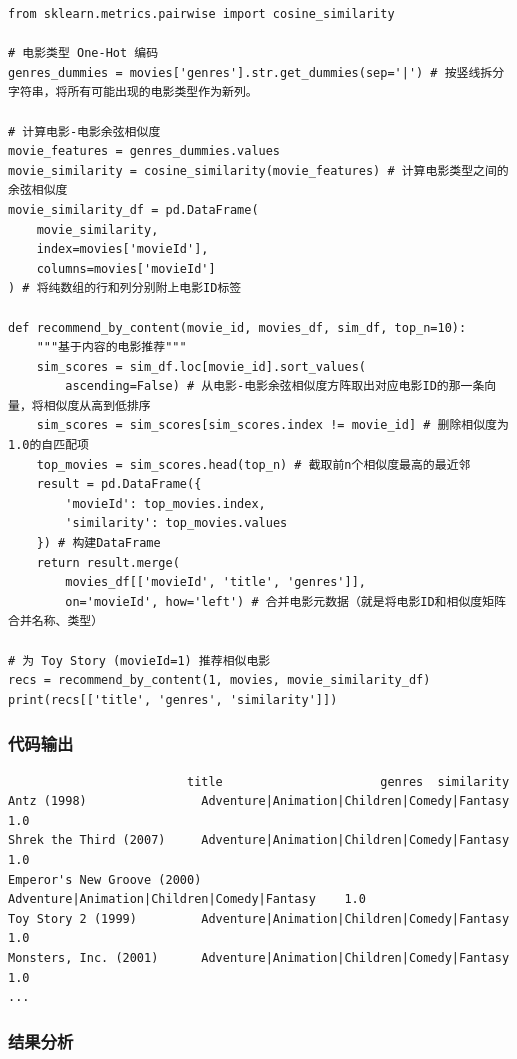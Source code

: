 \documentclass[12pt,a4paper]{ctexart}
\begin{document}
\begin{lstlisting}[caption={基于类型标签的内容推荐}, label={lst:3-1}]
from sklearn.metrics.pairwise import cosine_similarity

# 电影类型 One-Hot 编码
genres_dummies = movies['genres'].str.get_dummies(sep='|') # 按竖线拆分字符串，将所有可能出现的电影类型作为新列。

# 计算电影-电影余弦相似度
movie_features = genres_dummies.values
movie_similarity = cosine_similarity(movie_features) # 计算电影类型之间的余弦相似度
movie_similarity_df = pd.DataFrame(
    movie_similarity,
    index=movies['movieId'],
    columns=movies['movieId']
) # 将纯数组的行和列分别附上电影ID标签

def recommend_by_content(movie_id, movies_df, sim_df, top_n=10):
    """基于内容的电影推荐"""
    sim_scores = sim_df.loc[movie_id].sort_values(
        ascending=False) # 从电影-电影余弦相似度方阵取出对应电影ID的那一条向量，将相似度从高到低排序
    sim_scores = sim_scores[sim_scores.index != movie_id] # 删除相似度为1.0的自匹配项
    top_movies = sim_scores.head(top_n) # 截取前n个相似度最高的最近邻
    result = pd.DataFrame({
        'movieId': top_movies.index,
        'similarity': top_movies.values
    }) # 构建DataFrame
    return result.merge(
        movies_df[['movieId', 'title', 'genres']],
        on='movieId', how='left') # 合并电影元数据（就是将电影ID和相似度矩阵合并名称、类型）

# 为 Toy Story (movieId=1) 推荐相似电影
recs = recommend_by_content(1, movies, movie_similarity_df)
print(recs[['title', 'genres', 'similarity']])
\end{lstlisting}

\subsubsection{代码输出}

{\footnotesize
\begin{verbatim}
                         title                      genres  similarity
Antz (1998)                Adventure|Animation|Children|Comedy|Fantasy    1.0
Shrek the Third (2007)     Adventure|Animation|Children|Comedy|Fantasy    1.0
Emperor's New Groove (2000) Adventure|Animation|Children|Comedy|Fantasy    1.0
Toy Story 2 (1999)         Adventure|Animation|Children|Comedy|Fantasy    1.0
Monsters, Inc. (2001)      Adventure|Animation|Children|Comedy|Fantasy    1.0
...
\end{verbatim}
}

\subsubsection{结果分析}
\end{document}
